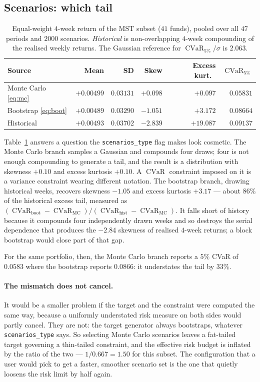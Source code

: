 \documentclass[11pt,a4paper]{article}
\newcommand{\code}[1]{\texttt{#1}}
\DeclareMathOperator{\CVaR}{CVaR}
\begin{document}
\subsection{Scenarios: which tail}

\begin{table}[t]
\centering
\caption{Equal-weight $4$-week return of the MST subset ($41$ funds), pooled
over all $47$ periods and $2000$ scenarios. \emph{Historical} is
non-overlapping $4$-week compounding of the realised weekly returns. The
Gaussian reference for $\CVaR_{5\%}/\sigma$ is $2.063$.}
\label{tab:scen}
\begin{tabular}{lrrrrr}
\toprule
Source & Mean & SD & Skew & Excess kurt.\ & $\CVaR_{5\%}$ \\
\midrule
Monte Carlo \eqref{eq:mc} & $+0.00499$ & $0.03131$ & $+0.098$ & $+0.097$  & $0.05831$ \\
Bootstrap \eqref{eq:boot} & $+0.00489$ & $0.03290$ & $-1.051$ & $+3.172$  & $0.08664$ \\
Historical                & $+0.00493$ & $0.03702$ & $-2.839$ & $+19.087$ & $0.09137$ \\
\bottomrule
\end{tabular}
\end{table}

Table~\ref{tab:scen} answers a question the \code{scenarios\_type} flag makes
look cosmetic. The Monte Carlo branch samples a Gaussian and compounds four
draws; four is not enough compounding to generate a tail, and the result is a
distribution with skewness $+0.10$ and excess kurtosis $+0.10$. A
$\CVaR$ constraint imposed on it is a variance constraint wearing different
notation. The bootstrap branch, drawing historical weeks, recovers skewness
$-1.05$ and excess kurtosis $+3.17$ --- about $86\%$ of the historical excess
tail, measured as
$(\CVaR_{\mathrm{boot}} - \CVaR_{\mathrm{MC}})/(\CVaR_{\mathrm{hist}} -
\CVaR_{\mathrm{MC}})$. It falls short of history because it compounds four
independently drawn weeks and so destroys the serial dependence that produces
the $-2.84$ skewness of realised $4$-week returns; a block bootstrap
\citep{politis1994} would close part of that gap.

For the same portfolio, then, the Monte Carlo branch reports a $5\%$ CVaR of
$0.0583$ where the bootstrap reports $0.0866$: it understates the tail by
$33\%$.

\paragraph{The mismatch does not cancel.}
It would be a smaller problem if the target and the constraint were computed
the same way, because a uniformly understated risk measure on both sides would
partly cancel. They are not: the target generator always bootstraps, whatever
\code{scenarios\_type} says. So selecting Monte Carlo scenarios leaves a
fat-tailed target governing a thin-tailed constraint, and the effective risk
budget is inflated by the ratio of the two --- $1/0.667 = 1.50$ for this subset.
The configuration that a user would pick to get a faster, smoother scenario
set is the one that quietly loosens the risk limit by half again.
\end{document}
